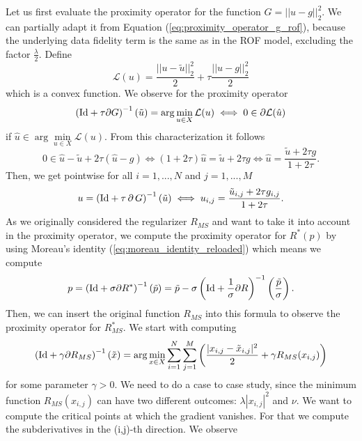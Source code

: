 \documentclass[abstracton]{scrreprt}
\begin{document}
            Let us first evaluate the proximity operator for the function $G = ||u - g||_{2}^{2}$. We can partially adapt it from Equation (\ref{eq:proximity_operator_g_rof}), because the underlying data fidelity term is the same as in the ROF model, excluding the factor $\frac{\lambda}{2}$. Define
                $$
                    \mathcal{L}(u) = \frac{||u - \tilde{u}||_{2}^{2}}{2} + \tau \frac{||u - g||_{2}^{2}}{2}
                $$
            which is a convex function. We observe for the proximity operator
                $$
                    \left( \textnormal{Id} + \tau \partial G \right)^{-1}(\tilde{u}) = \arg \min_{u \in X} \mathcal{L}(u) \iff 0 \in \partial \mathcal{L}(\hat{u})
                $$
            if $\hat{u} \in \arg\min\limits_{u \in X} \mathcal{L}(u)$. From this characterization it follows
                $$
                    0 \in \hat{u} - \tilde{u} + 2\tau (\hat{u} - g) \iff (1 + 2\tau)\hat{u} = \tilde{u} + 2\tau g \iff \hat{u} = \frac{\tilde{u} + 2\tau g}{1 + 2\tau}.
                $$
            Then, we get pointwise for all $i = 1, ..., N$ and $j = 1, ..., M$
                $$
                    u = \left( \textnormal{Id} + \tau\,\partial\,G \right)^{-1}(\tilde{u}) \iff u_{i,j} = \frac{\tilde{u}_{i,j} + 2\tau g_{i,j}}{1 + 2\tau}.
                $$
            As we originally considered the regularizer $R_{MS}$ and want to take it into account in the proximity operator, we compute the proximity operator for $R^{\ast}(p)$ by using Moreau's identity (\ref{eq:moreau_identity_reloaded}) which means we compute
                \begin{equation}
                    p = \left( \textnormal{Id} + \sigma \partial R^{\ast} \right)^{-1}(\tilde{p}) = \tilde{p} - \sigma \left( \textnormal{Id} + \frac{1}{\sigma} \partial R \right)^{-1} \left(\frac{\tilde{p}}{\sigma} \right).
                \label{eq:moreau_mumford_shah_regularizer}
                \end{equation}
            Then, we can insert the original function $R_{MS}$ into this formula to observe the proximity operator for $R^{\ast}_{MS}$. We start with computing
                $$
                    \left( \textnormal{Id} + \gamma\partial R_{MS} \right)^{-1}(\tilde{x}) = \arg \min_{x \in X} \sum_{i = 1}^{N} \sum_{j = 1}^{M} \left( \frac{|x_{i,j} - \tilde{x}_{i,j}|^{2}}{2} + \gamma R_{MS}(x_{i,j}) \right)
                $$
            for some parameter $\gamma > 0$. We need to do a case to case study, since the minimum function $R_{MS}(x_{i,j})$ can have two different outcomes: $\lambda |x_{i,j}|^{2}$ and $\nu$. We want to compute the critical points at which the gradient vanishes. For that we compute the subderivatives in the (i,j)-th direction. We observe
\end{document}
